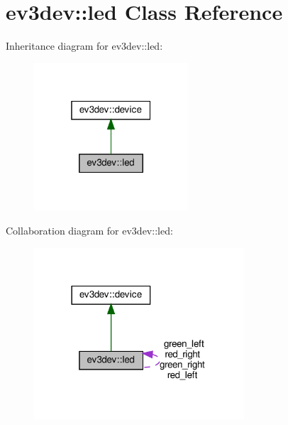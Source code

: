 \hypertarget{classev3dev_1_1led}{}\section{ev3dev\+:\+:led Class Reference}
\label{classev3dev_1_1led}


Inheritance diagram for ev3dev\+:\+:led\+:
\nopagebreak
\begin{figure}[H]
\begin{center}
\leavevmode
\includegraphics[width=163pt]{classev3dev_1_1led__inherit__graph}
\end{center}
\end{figure}


Collaboration diagram for ev3dev\+:\+:led\+:
\nopagebreak
\begin{figure}[H]
\begin{center}
\leavevmode
\includegraphics[width=222pt]{classev3dev_1_1led__coll__graph}
\end{center}
\end{figure}
